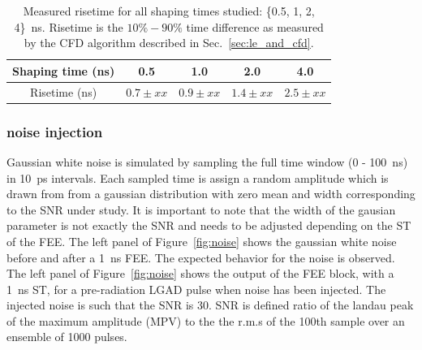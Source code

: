 \documentclass[preprint,1p]{elsarticle}
\begin{document}
\begin{table}[!htb]
\scriptsize
\begin{center}
  \begin{tabular}{ |c | c | c | c | c | }
    \hline
    Shaping time (ns) & 0.5         & 1.0         & 2.0         & 4.0 \\ \hline
    Risetime (ns)     & $0.7\pm xx$ & $0.9\pm xx$ & $1.4\pm xx$ & $2.5\pm xx$ \\
    \hline
  \end{tabular}
\caption{Measured risetime for all shaping times studied: \{0.5, 1, 2, 4\}~\si{ns}. Risetime is the $10\% - 90\%$ time
difference as measured by the CFD algorithm described in Sec.~\ref{sec:le_and_cfd}.}
\label{tab:risetime}
\end{center}
\end{table}


\subsubsection{noise injection}\label{sec:noise_simulation}
Gaussian white noise is simulated by sampling the full time window (0 - 100~\si{ns}) in 10~\si{ps} intervals. Each
sampled time is assign a random amplitude which is drawn from from a gaussian distribution with zero mean and width corresponding to the SNR
under study. It is important to note that the width of the gausian parameter is not exactly the SNR and needs to be adjusted depending
on the ST of the FEE. The left panel of Figure~\ref{fig:noise} shows the gaussian white noise before and after a 1~\si{ns} FEE.
The expected behavior for the noise is observed. The left panel of Figure~\ref{fig:noise} shows the output of the FEE block, with a 1~\si{ns} ST,
 for a pre-radiation LGAD pulse when noise has been injected. The injected noise is such that the SNR is 30. SNR is defined ratio of the
 landau peak of the maximum amplitude (MPV) to the the r.m.s of the 100th sample over an ensemble of 1000 pulses.
\end{document}
